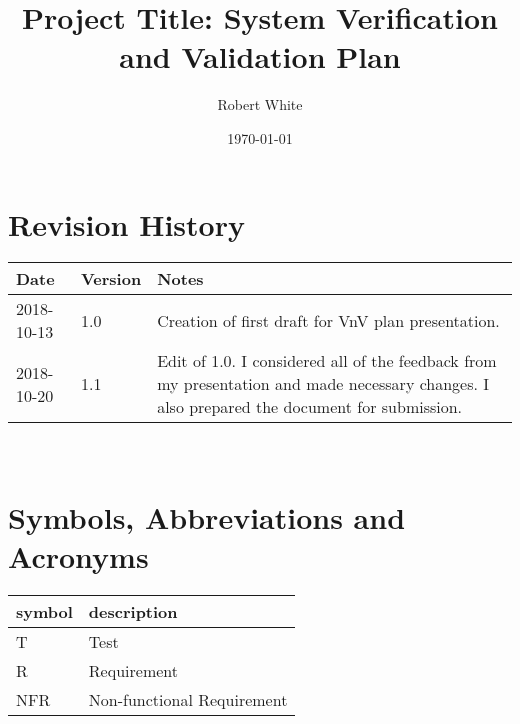 \documentclass[12pt, titlepage]{article}
\begin{document}
\title{Project Title: System Verification and Validation Plan} 
\author{Robert White}
\date{\today}
	
\maketitle


\section{Revision History}

\begin{tabularx}{\textwidth}{p{3cm}p{2cm}X}
\toprule {\bf Date} & {\bf Version} & {\bf Notes}\\
\midrule
2018-10-13 & 1.0 & Creation of first draft for VnV plan presentation.\\
2018-10-20 & 1.1 & Edit of 1.0. I considered all of the feedback from my 
presentation and made necessary changes. I also prepared the document for 
submission. \\ 
\bottomrule
\end{tabularx}

~\newpage

\section{Symbols, Abbreviations and Acronyms}

\renewcommand{\arraystretch}{1.2}
\begin{tabular}{l l} 
  \toprule		
  \textbf{symbol} & \textbf{description}\\
  \midrule 
  T & Test\\
  R & Requirement\\ 
  NFR & Non-functional Requirement\\ 
  \bottomrule
\end{tabular}\\


\newpage

\tableofcontents

\listoftables



\listoffigures

\newpage

\end{document}
